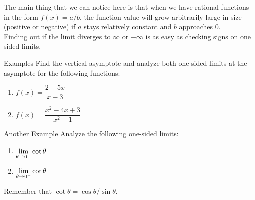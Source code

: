 The main thing that we can notice here is that when we have rational functions in the form $f(x)=a/b$, the function value will grow arbitrarily large in size (positive or negative) if $a$ stays relatively constant and $b$ approaches 0.\\

Finding out if the limit diverges to $\infty$ or $-\infty$ is as easy as checking signs on one sided limits.

\begin{note}{Examples}
Find the vertical asymptote and analyze both one-sided limits at the asymptote for the following functions:
\begin{multicols}{2}
  \begin{enumerate}
    \item $f(x) = \dfrac{2-5x}{x-3}$
    \item $f(x) = \dfrac{x^2-4x+3}{x^2-1}$
  \end{enumerate}
\end{multicols}
\end{note}

\begin{note}{Another Example}
Analyze the following one-sided limits:
\begin{multicols}{2}
  \begin{enumerate}
    \item $\displaystyle \lim_{\theta\to0^+} \cot \theta$
    \item $\displaystyle \lim_{\theta\to0^-} \cot \theta$
  \end{enumerate}
\end{multicols}
Remember that $\cot \theta = \cos \theta / \sin \theta$.
\end{note}
